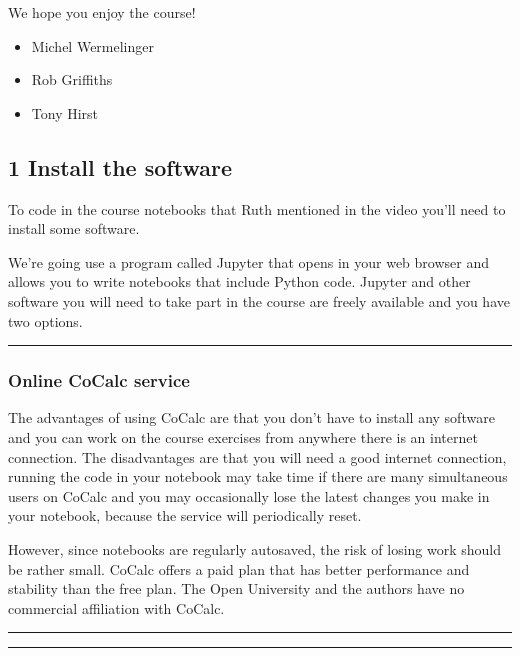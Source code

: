 \documentclass[letterpaper,10pt,english]{sphinxmanual}
\begin{document}
We hope you enjoy the course!
\begin{itemize}
\item {} 
Michel Wermelinger

\item {} 
Rob Griffiths

\item {} 
Tony Hirst

\end{itemize}


\subsection{1 Install the software}
\label{\detokenize{content/session_01/Part_01_02:1-Install-the-software}}\label{\detokenize{content/session_01/Part_01_02::doc}}
To code in the course notebooks that Ruth mentioned in the video you’ll need to install some software.

We’re going use a program called Jupyter that opens in your web browser and allows you to write notebooks that include Python code. Jupyter and other software you will need to take part in the course are freely available and you have two options.


\bigskip\hrule\bigskip



\subsubsection{Online CoCalc service}
\label{\detokenize{content/session_01/Part_01_02:Online-CoCalc-service}}
The advantages of using CoCalc are that you don’t have to install any software and you can work on the course exercises from anywhere there is an internet connection. The disadvantages are that you will need a good internet connection, running the code in your notebook may take time if there are many simultaneous users on CoCalc and you may occasionally lose the latest changes you make in your notebook, because the service will periodically reset.

However, since notebooks are regularly auto\sphinxhyphen{}saved, the risk of losing work should be rather small. CoCalc offers a paid plan that has better performance and stability than the free plan. The Open University and the authors have no commercial affiliation with CoCalc.


\bigskip\hrule\bigskip



\bigskip\hrule\bigskip
\end{document}
